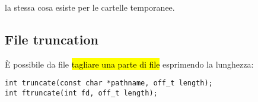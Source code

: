 la stessa cosa esiste per le cartelle temporanee.


\subsection{File truncation}

È possibile da file \hl{tagliare una parte di file} esprimendo la lunghezza:

\begin{lstlisting}
int truncate(const char *pathname, off_t length); 
int ftruncate(int fd, off_t length);
\end{lstlisting}

